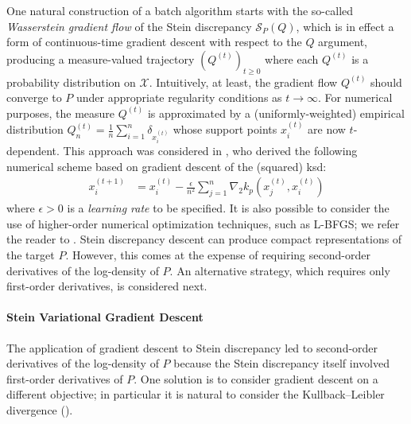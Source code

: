 \documentclass[12pt,paper=letter]{scrreprt}
\begin{document}
One natural construction of a batch algorithm starts with the so-called \emph{Wasserstein gradient flow} of the Stein discrepancy $\mathcal{S}_P(Q)$, which is in effect a form of continuous-time gradient descent with respect to the $Q$ argument, producing a measure-valued trajectory $(Q^{(t)})_{t \geq 0}$ where each $Q^{(t)}$ is a probability distribution on $\mathcal{X}$.
Intuitively, at least, the gradient flow $Q^{(t)}$ should converge to $P$ under appropriate regularity conditions as $t \rightarrow \infty$.
For numerical purposes, the measure $Q^{(t)}$ is approximated by a (uniformly-weighted) empirical distribution $Q_n^{(t)} = \frac{1}{n} \sum_{i=1}^n \delta_{x_i^{(t)}}$ whose support points $x_i^{(t)}$ are now $t$-dependent.
This approach was considered in \citet{korba2021kernel}, who derived the following numerical scheme based on gradient descent of the (squared) \ac{ksd}:
\begin{align*}
    x_i^{(t+1)} & = x_i^{(t)} -  \frac{\epsilon}{n^2} \sum_{j=1}^n \nabla_2 k_p(x_j^{(t)} , x_i^{(t)})
\end{align*}
where $\epsilon > 0$ is a \emph{learning rate} to be specified.
It is also possible to consider the use of higher-order numerical optimization techniques, such as L-BFGS; we refer the reader to \citet{korba2021kernel}.
Stein discrepancy descent can produce compact representations of the target $P$.
However, this comes at the expense of requiring second-order derivatives of the log-density of $P$.
An alternative strategy, which requires only first-order derivatives, is considered next.






\paragraph{Stein Variational Gradient Descent}

The application of gradient descent to Stein discrepancy led to second-order derivatives of the log-density of $P$ because the Stein discrepancy itself involved first-order derivatives of $P$.
One solution is to consider gradient descent on a different objective; in particular it is natural to consider the Kullback--Leibler divergence ().
\end{document}
